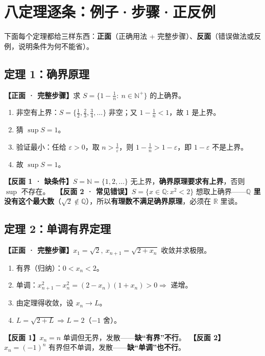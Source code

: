 \documentclass[11pt,a4paper,UTF8]{ctexart}
\newcommand{\R}{\mathbb R}
\newcommand{\eps}{\varepsilon}
\newcommand{\N}{\mathbb N}
\newcommand{\Q}{\mathbb Q}
\begin{document}
\section{八定理逐条：例子·步骤·正反例}

下面每个定理都给三样东西：\textbf{正面}（正确用法 + 完整步骤）、\textbf{反面}（错误做法或反例，说明条件为何不能省）。

\subsection{定理 1：确界原理}

\noindent\textbf{【正面 · 完整步骤】}求 $S=\{1-\tfrac1n:\ n\in\N^+\}$ 的上确界。
\begin{enumerate}[leftmargin=1.6em,label=\textbf{Step \arabic*.}]
\item 非空有上界：$S=\{\tfrac12,\tfrac23,\tfrac34,\dots\}$ 非空；又 $1-\tfrac1n<1$，故 $1$ 是上界。
\item 猜 $\sup S=1$。
\item 验证最小：任给 $\eps>0$，取 $n>\frac1\eps$，则 $1-\tfrac1n>1-\eps$，即 $1-\eps$ 不是上界。
\item 故 $\sup S=1$。
\end{enumerate}
\textbf{【反面 1 · 缺条件】}$S=\N=\{1,2,\dots\}$ 无上界，\textbf{确界原理要求有上界}，否则 $\sup$ 不存在。
\ \textbf{【反面 2 · 常见错误】}$S=\{x\in\Q:x^2<2\}$ 想取上确界——\textbf{$\Q$ 里没有这个最大数}（$\sqrt2\notin\Q$），所以\textbf{有理数不满足确界原理}，必须在 $\R$ 里谈。

\subsection{定理 2：单调有界定理}

\noindent\textbf{【正面 · 完整步骤】}$x_1=\sqrt2,\ x_{n+1}=\sqrt{2+x_n}$ 收敛并求极限。
\begin{enumerate}[leftmargin=1.6em,label=\textbf{Step \arabic*.}]
\item 有界（归纳）：$0<x_n<2$。
\item 单调：$x_{n+1}^2-x_n^2=(2-x_n)(1+x_n)>0\Rightarrow$ 递增。
\item 由定理得收敛，设 $x_n\to L$。
\item $L=\sqrt{2+L}\Rightarrow L=2$（$-1$ 舍）。
\end{enumerate}
\textbf{【反面 1】}$x_n=n$ 单调但无界，发散——\textbf{缺“有界”不行}。\ \textbf{【反面 2】}$x_n=(-1)^n$ 有界但不单调，发散——\textbf{缺“单调”也不行}。
\end{document}
